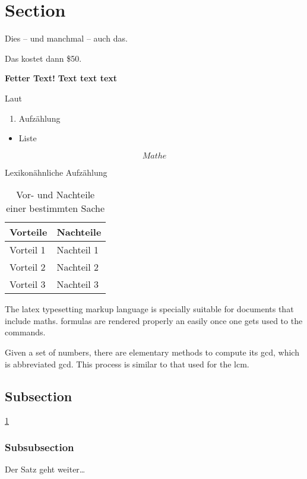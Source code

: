 
\section{Section}


Dies -- und manchmal -- auch das.

Das kostet dann \$50.

\textbf{Fetter Text!}
\bfseries
Text text text
\normalfont %

Laut \cite{nguyen_machine_2018}


\begin{enumerate}
    \item Aufzählung
\end{enumerate}

\begin{itemize}
    \item Liste
\end{itemize}

\begin{equation}
    Mathe
\end{equation}

\begin{description}
    \item[Lexikonähnliche Aufzählung]
\end{description}


\begin{table}[h]
    \centering
    \begin{tabular}{|p{5cm}|p{5cm}|} 
        \hline
        \textbf{Vorteile} & \textbf{Nachteile} \\
        \hline
        Vorteil 1 & Nachteil 1 \\
        Vorteil 2 & Nachteil 2 \\
        Vorteil 3 & Nachteil 3 \\
        \hline
    \end{tabular}
    \caption{Vor- und Nachteile einer bestimmten Sache}
    \label{tab:beispiel}
\end{table}


The \Gls{latex} typesetting markup language is specially suitable 
for documents that include \gls{maths}. \Glspl{formula} are 
rendered properly an easily once one gets used to the commands.

Given a set of numbers, there are elementary methods to compute 
its \acrlong{gcd}, which is abbreviated \acrshort{gcd}. This 
process is similar to that used for the \acrfull{lcm}.

    \subsection{Subsection}
    \lipsum[1]
    \ref{tab:beispiel}
    
        \subsubsection{Subsubsection}
        \lipsum[1] Der Satz geht weiter\dots
